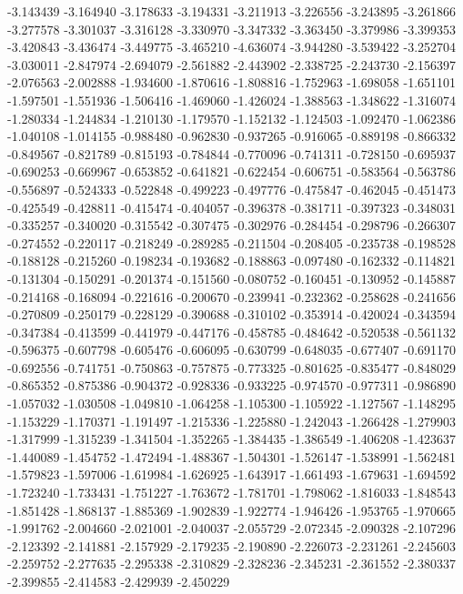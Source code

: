 -3.143439
-3.164940
-3.178633
-3.194331
-3.211913
-3.226556
-3.243895
-3.261866
-3.277578
-3.301037
-3.316128
-3.330970
-3.347332
-3.363450
-3.379986
-3.399353
-3.420843
-3.436474
-3.449775
-3.465210
-4.636074
-3.944280
-3.539422
-3.252704
-3.030011
-2.847974
-2.694079
-2.561882
-2.443902
-2.338725
-2.243730
-2.156397
-2.076563
-2.002888
-1.934600
-1.870616
-1.808816
-1.752963
-1.698058
-1.651101
-1.597501
-1.551936
-1.506416
-1.469060
-1.426024
-1.388563
-1.348622
-1.316074
-1.280334
-1.244834
-1.210130
-1.179570
-1.152132
-1.124503
-1.092470
-1.062386
-1.040108
-1.014155
-0.988480
-0.962830
-0.937265
-0.916065
-0.889198
-0.866332
-0.849567
-0.821789
-0.815193
-0.784844
-0.770096
-0.741311
-0.728150
-0.695937
-0.690253
-0.669967
-0.653852
-0.641821
-0.622454
-0.606751
-0.583564
-0.563786
-0.556897
-0.524333
-0.522848
-0.499223
-0.497776
-0.475847
-0.462045
-0.451473
-0.425549
-0.428811
-0.415474
-0.404057
-0.396378
-0.381711
-0.397323
-0.348031
-0.335257
-0.340020
-0.315542
-0.307475
-0.302976
-0.284454
-0.298796
-0.266307
-0.274552
-0.220117
-0.218249
-0.289285
-0.211504
-0.208405
-0.235738
-0.198528
-0.188128
-0.215260
-0.198234
-0.193682
-0.188863
-0.097480
-0.162332
-0.114821
-0.131304
-0.150291
-0.201374
-0.151560
-0.080752
-0.160451
-0.130952
-0.145887
-0.214168
-0.168094
-0.221616
-0.200670
-0.239941
-0.232362
-0.258628
-0.241656
-0.270809
-0.250179
-0.228129
-0.390688
-0.310102
-0.353914
-0.420024
-0.343594
-0.347384
-0.413599
-0.441979
-0.447176
-0.458785
-0.484642
-0.520538
-0.561132
-0.596375
-0.607798
-0.605476
-0.606095
-0.630799
-0.648035
-0.677407
-0.691170
-0.692556
-0.741751
-0.750863
-0.757875
-0.773325
-0.801625
-0.835477
-0.848029
-0.865352
-0.875386
-0.904372
-0.928336
-0.933225
-0.974570
-0.977311
-0.986890
-1.057032
-1.030508
-1.049810
-1.064258
-1.105300
-1.105922
-1.127567
-1.148295
-1.153229
-1.170371
-1.191497
-1.215336
-1.225880
-1.242043
-1.266428
-1.279903
-1.317999
-1.315239
-1.341504
-1.352265
-1.384435
-1.386549
-1.406208
-1.423637
-1.440089
-1.454752
-1.472494
-1.488367
-1.504301
-1.526147
-1.538991
-1.562481
-1.579823
-1.597006
-1.619984
-1.626925
-1.643917
-1.661493
-1.679631
-1.694592
-1.723240
-1.733431
-1.751227
-1.763672
-1.781701
-1.798062
-1.816033
-1.848543
-1.851428
-1.868137
-1.885369
-1.902839
-1.922774
-1.946426
-1.953765
-1.970665
-1.991762
-2.004660
-2.021001
-2.040037
-2.055729
-2.072345
-2.090328
-2.107296
-2.123392
-2.141881
-2.157929
-2.179235
-2.190890
-2.226073
-2.231261
-2.245603
-2.259752
-2.277635
-2.295338
-2.310829
-2.328236
-2.345231
-2.361552
-2.380337
-2.399855
-2.414583
-2.429939
-2.450229
